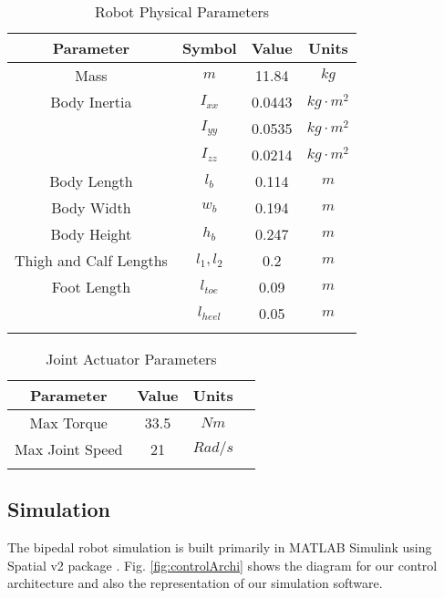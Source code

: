 \begin{table}[h]
	\vspace{0.2cm}
	\centering
	\caption{Robot Physical Parameters}
	\label{tab:PRP}
	\begin{tabular}{cccc}
		\hline
		Parameter & Symbol & Value & Units\\
		\hline
		Mass & $m$    & 11.84 & $\unit{kg}$  \\[.5ex]
		Body Inertia  & $I_{xx}$  & 0.0443 & $\unit{kg}\cdot \unit{m}^2$ \\[.5ex]
		& $I_{yy}$ & 0.0535  & $\unit{kg}\cdot \unit{m}^2$ \\[.5ex]
		& $I_{zz}$ & 0.0214  & $\unit{kg}\cdot \unit{m} ^2$ \\[.5ex]
		Body Length & $l_{b}$ & 0.114 & $\unit{m}$ \\[.5ex]
		Body Width & $w_{b}$ & 0.194 & $\unit{m}$ \\[.5ex]
		Body Height & $h_{b}$ & 0.247 & $\unit{m}$ \\[.5ex]
		Thigh and Calf Lengths & $l_{1}, l_{2}$ & 0.2 & $\unit{m}$ \\[.5ex]
		Foot Length & $l_{toe}$ & 0.09 & $\unit{m}$ \\[.5ex]
		& $l_{heel}$ & 0.05 & $\unit{m}$ \\[.5ex]
		\hline 
		\label{tab:robot}
	\end{tabular}
\end{table}	

	\begin{table}[h]
		\centering
		\caption{Joint Actuator Parameters}
		\begin{tabular}{cccc}
			\hline
			Parameter & Value & Units\\
			\hline
			Max Torque   &  33.5 & $\unit{Nm}$  \\[.5ex]
			Max Joint Speed    & 21  & $\unit{Rad}/\unit{s}$  \\[.5ex]
			\hline 
			\label{tab:motor}
			\end{tabular}
			\end{table}
\subsection{Simulation}
\label{subsec:simulation}

The bipedal robot simulation is built primarily in MATLAB Simulink using Spatial v2 package \cite{featherstone2014rigid}. Fig. \ref{fig:controlArchi} shows the diagram for our control architecture and also the representation of our simulation software.

